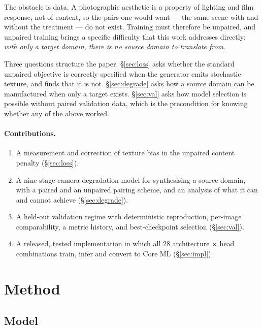 \documentclass[11pt,a4paper]{article}
\begin{document}
The obstacle is data. A photographic aesthetic is a property of lighting and film
response, not of content, so the pairs one would want --- the same scene with and
without the treatment --- do not exist. Training must therefore be unpaired, and
unpaired training brings a specific difficulty that this work addresses directly:
\emph{with only a target domain, there is no source domain to translate from}.

Three questions structure the paper. \S\ref{sec:loss} asks whether the standard
unpaired objective is correctly specified when the generator emits stochastic
texture, and finds that it is not. \S\ref{sec:degrade} asks how a source domain
can be manufactured when only a target exists. \S\ref{sec:val} asks how model
selection is possible without paired validation data, which is the precondition
for knowing whether any of the above worked.

\paragraph{Contributions.}
\begin{enumerate}[leftmargin=1.5em]
  \item A measurement and correction of texture bias in the unpaired content
        penalty (\S\ref{sec:loss}).
  \item A nine-stage camera-degradation model for synthesising a source domain,
        with a paired and an unpaired pairing scheme, and an analysis of what it
        can and cannot achieve (\S\ref{sec:degrade}).
  \item A held-out validation regime with deterministic reproduction,
        per-image comparability, a metric history, and best-checkpoint
        selection (\S\ref{sec:val}).
  \item A released, tested implementation in which all $28$ architecture
        $\times$ head combinations train, infer and convert to Core ML
        (\S\ref{sec:impl}).
\end{enumerate}

\section{Method}

\subsection{Model}
\end{document}
